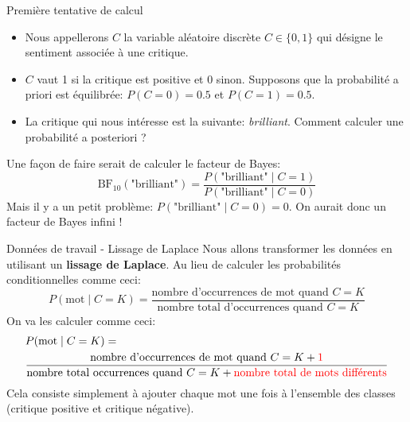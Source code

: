 \documentclass[10pt]{beamer}  %
\begin{document}
\begin{frame}{Première tentative de calcul}
	\begin{itemize}
		\item Nous appellerons $C$ la variable aléatoire discrète $C \in \{0, 1\}$ qui désigne le sentiment associée à une critique.
		\pause
		\item  $C$ vaut 1 si la critique est positive et 0 sinon.	Supposons que la probabilité a priori est équilibrée: $P(C = 0) = 0.5$ et $P(C = 1) = 0.5$.
		\pause
		\item La critique qui nous intéresse est la suivante: \textit{brilliant}. Comment calculer une probabilité a posteriori ?
	\end{itemize}
	\pause
	Une façon de faire serait de calculer le facteur de Bayes:
	\begin{equation}
		\text{BF}_{10}(\text{"brilliant"}) = \frac{P(\text{"brilliant"} \mid C = 1)}{P(\text{"brilliant"} \mid C = 0)}
		\nonumber
	\end{equation}
	Mais il y a un petit problème: $P(\text{"brilliant"} \mid C = 0) = 0$. On aurait donc un facteur de Bayes infini !
\end{frame}

\begin{frame}{Données de travail - Lissage de Laplace}
	Nous allons transformer les données en utilisant un \textbf{lissage de Laplace}. Au lieu de calculer les probabilités conditionnelles comme ceci:
	\begin{equation}
		P(\text{mot} \mid C = K) = \frac{\text{nombre d'occurrences de mot quand } C = K}{\text{nombre total d'occurrences quand }C = K}
		\nonumber
	\end{equation}
	\pause
	On va les calculer comme ceci:
	\begin{equation}
		\begin{split}
			&P(\text{mot} \mid C = K) = \\
			&\frac{\text{nombre d'occurrences de mot quand } C = K + \color{red}1}{\text{nombre total occurrences quand } C = K + \color{red} \text{nombre total de mots différents}}
		\end{split}
		\nonumber
	\end{equation}
	\pause
	Cela consiste simplement à ajouter chaque mot une fois à l'ensemble des classes (critique positive et critique négative).
\end{frame}
\end{document}
